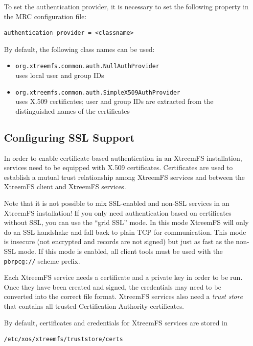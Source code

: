 \documentclass[a4paper,10pt]{book}
\begin{document}
To set the authentication provider, it is necessary to set the following property in the MRC configuration file:

\begin{verbatim}
authentication_provider = <classname>
\end{verbatim}

By default, the following class names can be used:

\begin{itemize}
 \item \texttt{org.xtreemfs.common.auth.NullAuthProvider}\\
uses local user and group IDs
 \item \texttt{org.xtreemfs.common.auth.SimpleX509AuthProvider}\\
uses X.509 certificates; user and group IDs are extracted from the distinguished names of the certificates
\end{itemize}


\subsection{Configuring SSL Support}
\label{sec:cfg_ssl}

In order to enable certificate-based authentication in an XtreemFS installation, services need to be equipped with X.509 certificates. Certificates are used to establish a mutual trust relationship among XtreemFS services and between the XtreemFS client and XtreemFS services.

Note that it is not possible to mix SSL-enabled and non-SSL services in an XtreemFS installation! If you only need authentication based on certificates without SSL, you can use the ``grid SSL'' mode. In this mode XtreemFS will only do an SSL handshake and fall back to plain TCP for communication. This mode is insecure (not encrypted and records are not signed) but just as fast as the non-SSL mode. If this mode is enabled, all client tools must be used with the \texttt{pbrpcg://} scheme prefix.

Each XtreemFS service needs a certificate and a private key in order to be run. Once they have been created and signed, the credentials may need to be converted into the correct file format. XtreemFS services also need a \textit{trust store} that contains all trusted Certification Authority certificates.

By default, certificates and credentials for XtreemFS services are stored in
\begin{verbatim}
/etc/xos/xtreemfs/truststore/certs
\end{verbatim}
\end{document}
